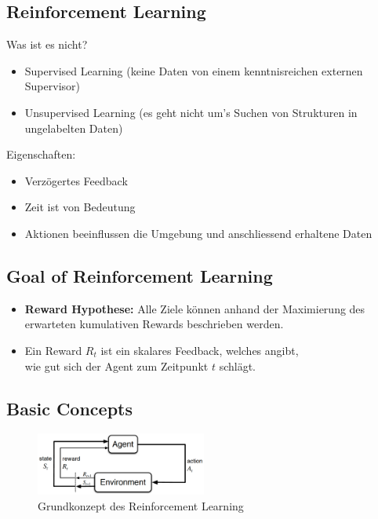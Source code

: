 \documentclass[a4paper]{article}
\begin{document}
		\subsection{Reinforcement Learning}
		
			Was ist es nicht?
			\begin{itemize}
				\item Supervised Learning (keine Daten von einem kenntnisreichen externen Supervisor)
				\item Unsupervised Learning (es geht nicht um's Suchen von Strukturen in ungelabelten Daten)
			\end{itemize}
			Eigenschaften:
			\begin{itemize}
				\item Verzögertes Feedback
				\item Zeit ist von Bedeutung
				\item Aktionen beeinflussen die Umgebung und anschliessend erhaltene Daten
			\end{itemize}
		
		\subsection{Goal of Reinforcement Learning}
		
		\begin{itemize}
			\item \textbf{Reward Hypothese:} 
				Alle Ziele können anhand der Maximierung des erwarteten kumulativen Rewards beschrieben werden.
			\item Ein Reward $R_t$ ist ein skalares Feedback, welches angibt, \\
				wie gut sich der Agent zum Zeitpunkt $t$ schlägt.
		\end{itemize}
		
		\subsection{Basic Concepts}
	
		\begin{figure}[htb!]
			\centering
			\includegraphics[width=0.5\textwidth]{img/08_reinforcement_learning/basic_concepts.png}
			\caption{Grundkonzept des Reinforcement Learning}
		\end{figure}
	
\end{document}
